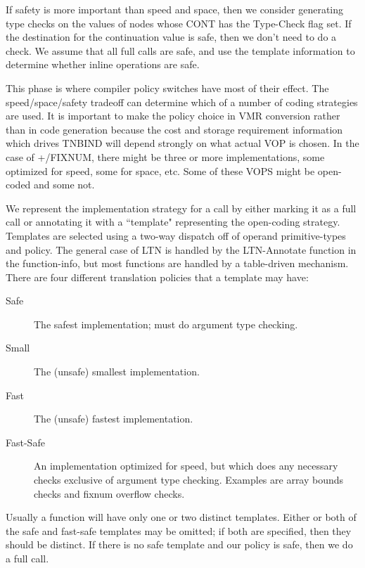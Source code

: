 If safety is more important than speed and space, then we consider generating
type checks on the values of nodes whose CONT has the Type-Check flag set.  If
the destination for the continuation value is safe, then we don't need to do
a check.  We assume that all full calls are safe, and use the template
information to determine whether inline operations are safe.

This phase is where compiler policy switches have most of their effect.  The
speed/space/safety tradeoff can determine which of a number of coding
strategies are used.  It is important to make the policy choice in VMR
conversion rather than in code generation because the cost and storage
requirement information which drives TNBIND will depend strongly on what actual
VOP is chosen.  In the case of +/FIXNUM, there might be three or more
implementations, some optimized for speed, some for space, etc.  Some of these
VOPS might be open-coded and some not.

We represent the implementation strategy for a call by either marking it as a
full call or annotating it with a ``template" representing the open-coding
strategy.  Templates are selected using a two-way dispatch off of operand
primitive-types and policy.  The general case of LTN is handled by the
LTN-Annotate function in the function-info, but most functions are handled by a
table-driven mechanism.  There are four different translation policies that a
template may have:
\begin{description}
\item[Safe]
        The safest implementation; must do argument type checking.

\item[Small]
        The (unsafe) smallest implementation.

\item[Fast]
        The (unsafe) fastest implementation.

\item[Fast-Safe]
        An implementation optimized for speed, but which does any necessary
        checks exclusive of argument type checking.  Examples are array bounds
        checks and fixnum overflow checks.
\end{description}

Usually a function will have only one or two distinct templates.  Either or
both of the safe and fast-safe templates may be omitted; if both are specified,
then they should be distinct.  If there is no safe template and our policy is
safe, then we do a full call.

